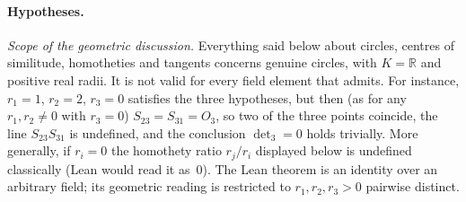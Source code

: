 \documentclass[11pt]{article}
\theoremstyle{definition}
\theoremstyle{remark}
\newcommand{\RR}{\mathbb{R}}
\begin{document}
\paragraph{Hypotheses.} \emph{Scope of the geometric discussion.} Everything said below about
circles, centres of similitude, homotheties and tangents concerns genuine circles, with
$K=\RR$ and positive real radii. It is not valid for every field element that
 admits. For instance, $r_1=1$, $r_2=2$, $r_3=0$ satisfies the three
hypotheses, but then (as for any $r_1,r_2\ne0$ with $r_3=0$) $S_{23}=S_{31}=O_3$, so two of the three points coincide, the line
$S_{23}S_{31}$ is undefined, and the conclusion $\det_3=0$ holds trivially. More generally, if
$r_i=0$ the homothety ratio $r_j/r_i$ displayed below is undefined classically (Lean would read it
as~$0$). The Lean theorem is an identity over an arbitrary field; its geometric reading is
restricted to $r_1,r_2,r_3>0$ pairwise distinct.
\end{document}
